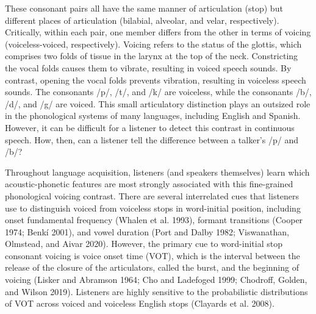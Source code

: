 \documentclass[
  preprint]{elsarticle}
\begin{document}
These consonant pairs all have the same manner of articulation (stop) but different places of articulation (bilabial, alveolar, and velar, respectively).
Critically, within each pair, one member differs from the other in terms of voicing (voiceless-voiced, respectively).
Voicing refers to the status of the glottis, which comprises two folds of tissue in the larynx at the top of the neck.
Constricting the vocal folds causes them to vibrate, resulting in voiced speech sounds.
By contrast, opening the vocal folds prevents vibration, resulting in voiceless speech sounds.
The consonants /p/, /t/, and /k/ are voiceless, while the consonants /b/, /d/, and /g/ are voiced.
This small articulatory distinction plays an outsized role in the phonological systems of many languages, including English and Spanish.
However, it can be difficult for a listener to detect this contrast in continuous speech.
How, then, can a listener tell the difference between a talker's /p/ and /b/?

Throughout language acquisition, listeners (and speakers themselves) learn which acoustic-phonetic features are most strongly associated with this fine-grained phonological voicing contrast.
There are several interrelated cues that listeners use to distinguish voiced from voiceless stops in word-initial position, including onset fundamental frequency (Whalen et al. 1993), formant transitions (Cooper 1974; Benkí 2001), and vowel duration (Port and Dalby 1982; Viswanathan, Olmstead, and Aivar 2020).
However, the primary cue to word-initial stop consonant voicing is voice onset time (VOT), which is the interval between the release of the closure of the articulators, called the burst, and the beginning of voicing (Lisker and Abramson 1964; Cho and Ladefoged 1999; Chodroff, Golden, and Wilson 2019).
Listeners are highly sensitive to the probabilistic distributions of VOT across voiced and voiceless English stops (Clayards et al. 2008).
\end{document}
